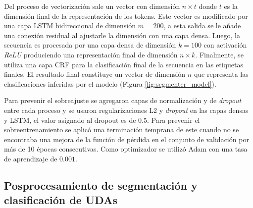 Del proceso de vectorización sale un vector con dimensión $n \times t$ donde $t$ es la dimensión final de la representación
de los tokens. Este vector es modificado por una capa LSTM bidireccional de dimensión $m=200$, a esta salida se le 
añade una conexión residual al ajustarle la dimensión con una capa densa. Luego, la secuencia es procesada por una 
capa densa de dimensión $k=100$ con activación \emph{ReLU} produciendo una representación final de dimensión 
$n \times k$. Finalmente, se utiliza una capa CRF
para la clasificación final de la secuencia en las etiquetas finales. El resultado final constituye un vector
de dimensión $n$ que representa las clasificaciones inferidas por el modelo (Figura \ref{fig:segmenter_model}).

Para prevenir el sobreajuste se agregaron capas de normalización y de \emph{dropout} entre cada proceso y se usaron regularizaciones
L2 y \emph{dropout} en las capas densas y LSTM, el valor asignado al dropout es de $0.5$. 
Para prevenir el sobreentrenamiento se aplicó una 
terminación temprana de este cuando no se encontraba una mejora de la función de pérdida en el conjunto de validación
por más de 10 épocas consecutivas. Como optimizador se utilizó Adam con una tasa de aprendizaje de $0.001$.

\subsection{Posprocesamiento de segmentación y clasificación de UDAs}


